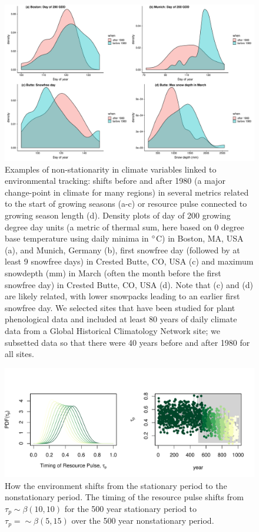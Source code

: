 \documentclass[11pt,letterpaper]{article}
\begin{document}
\clearpage
\begin{figure}[h!]
\centering
\includegraphics[width=1\textwidth]{..//..//..//R/graphs/otherdat/climdata.pdf}
\caption{Examples of non-stationarity in climate variables linked to environmental tracking: shifts before and after 1980 (a major change-point in climate for many regions) in several metrics related to the start of growing seasons (a-c) or resource pulse connected to growing season length (d). Density plots of day of 200 growing degree day units (a metric of thermal sum, here based on 0 degree base temperature using daily minima in $\degree$C) in Boston, MA, USA (a), and Munich, Germany (b), first snowfree day (followed by at least 9 snowfree days) in Crested Butte, CO, USA (c) and maximum snowdepth (mm) in March (often the month before the first snowfree day) in Crested Butte, CO, USA (d). Note that (c) and (d) are likely related, with lower snowpacks leading to an earlier first snowfree day. We selected sites that have been studied for plant phenological data and included at least 80 years of daily climate data from a Global Historical Climatology Network site; we subsetted data so that there were 40 years before and after 1980 for all sites.} %
 \label{fig:climdat}
\end{figure}


\begin{figure}[h!]
\centering
\includegraphics[width=1\textwidth]{..//..//..//R/graphs/modelruns/manuscript/modelsupp.pdf}
\caption{How the environment shifts from the stationary period to the nonstationary period. The timing of the resource pulse shifts from $\tau_{p} \sim \beta(10,10)$ for the 500 year stationary period to $\tau_{p}=\sim \beta(5,15)$ over the 500 year nonstationary period.}
\label{fig:figR0}
\end{figure}
\end{document}
